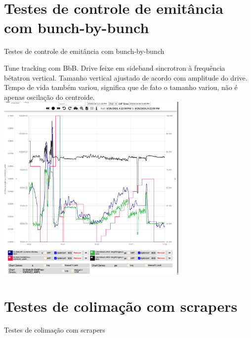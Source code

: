 \documentclass[1611]{beamer}            %
\begin{document}
\section{Testes de controle de emitância com bunch-by-bunch}

\begin{frame}
    \Huge{Testes de controle de emitância com bunch-by-bunch}
\end{frame}

\begin{frame}{}
\small{Tune tracking com BbB. Drive feixe em sideband sincrotron à frequência bétatron vertical. Tamanho vertical ajustado de acordo com amplitude do drive. Tempo de vida também variou, significa que de fato o tamanho variou, não é apenas oscilação do centroide.}
\centering
\includegraphics[width=0.7\textwidth]{2024-05-10/figures/emittance_control.png}
\end{frame}


\section{Testes de colimação com scrapers}

\begin{frame}
    \Huge{Testes de colimação com scrapers}
\end{frame}
\end{document}
